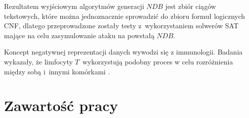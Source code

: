 Rezultatem wyjściowym algorytmów generacji $NDB$ jest zbiór ciągów tekstowych, które można jednoznacznie sprowadzić 
do zbioru formuł logicznych CNF, dlatego przeprowadzone zostały testy z~wykorzystaniem solwerów SAT mające na celu 
zasymulowanie ataku na powstałą $NDB$.

Koncept negatywnej reprezentacji danych wywodzi się z immunologii. Badania wykazały, że limfocyty $T$~wykorzystują
podobny proces w celu rozróżnienia między sobą i~innymi komórkami \cite{T-cells}.

\section{Zawartość pracy}

















